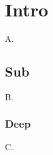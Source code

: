 \documentclass{article}
\begin{document}
\section{Intro}
A.
\subsection{Sub}
B.
\subsubsection{Deep}
C.
\end{document}
